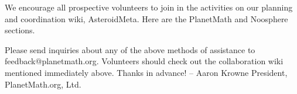 We encourage all prospective volunteers to join in the activities on our
planning and coordination wiki, AsteroidMeta. Here are the PlanetMath and
Noosphere sections.

Please send inquiries about any of the above methods of assistance to
feedback@planetmath.org. Volunteers should check out the collaboration wiki
mentioned immediately above. Thanks in advance! -- Aaron Krowne
President, PlanetMath.org, Ltd.
